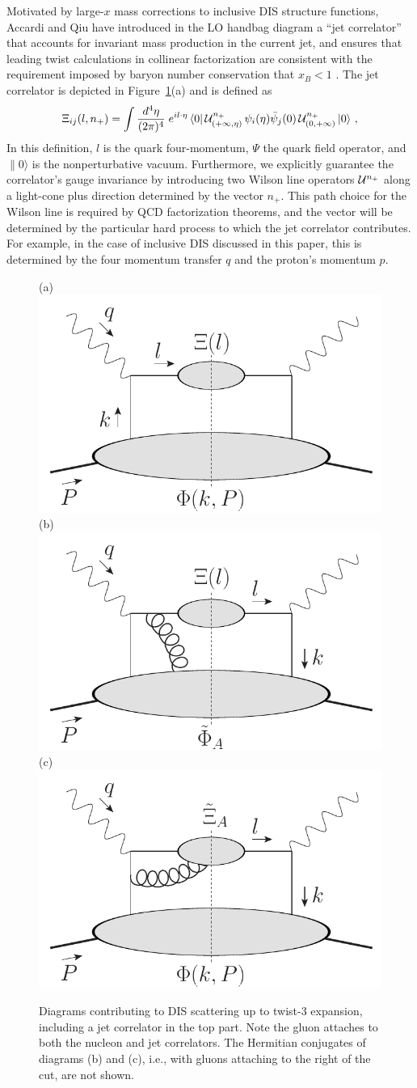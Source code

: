 \documentclass[preprintnumbers,floatfix,nofootinbib]{revtex4}
\newcommand{\de}{d}                    %
\begin{document}
Motivated by large-$x$ mass corrections to inclusive DIS structure functions, Accardi and Qiu have introduced in the LO handbag diagram a ``jet correlator'' that accounts for invariant mass production in the current jet, and ensures that leading twist calculations in collinear factorization are consistent with the requirement imposed by baryon number conservation that $x_B<1$ \cite{Accardi-Qiu}. The jet correlator is depicted in Figure~\ref{fig:handbags}(a) and is defined as
\begin{align} 
\Xi_{ij}(l,n_+) =\int
  \frac{\de^4\eta}{(2\pi)^4}\; e^{i l \cdot \eta}\,
    \langle 0|\, {\cal U}^{n_+}_{(+\infty,\eta)}
\,\psi_i(\eta)
             \bar{\psi}_j(0)\,
{\cal U}^{n_+}_{(0,+\infty)}\,   |0 \rangle \ ,
\label{e:xifull}
\end{align} 
In this definition, $l$ is the quark four-momentum, $\Psi$ the quark field operator, and $\|0\rangle$ is the nonperturbative vacuum. Furthermore, we explicitly guarantee the correlator's gauge invariance by introducing two Wilson line operators ${\cal U}^{n_+}$ along a light-cone plus direction determined by the vector $n_+$. This path choice for the Wilson line is required by QCD factorization theorems, and the vector will be determined by the particular hard process to which the jet correlator contributes. For example, in the case of inclusive DIS discussed in this paper, this is determined by the four momentum transfer $q$ and the proton's momentum $p$.

\begin{figure}
  \centering
  (a)\includegraphics[width=0.3\linewidth,valign=t]{jetdiagram0}
  \hfill
  (b)\includegraphics[width=0.3\linewidth,valign=t]{jetdiagram2}
  \hfill
  (c)\includegraphics[width=0.3\linewidth,valign=t]{jetdiagram1}
  \caption{Diagrams contributing to DIS scattering up to twist-3 expansion, including a jet correlator in the top part. Note the gluon attaches to both the nucleon and jet correlators. The Hermitian conjugates of diagrams (b) and (c), i.e., with gluons attaching to the right of the cut, are not shown.
  }
  \label{fig:handbags}
\end{figure}
\end{document}
